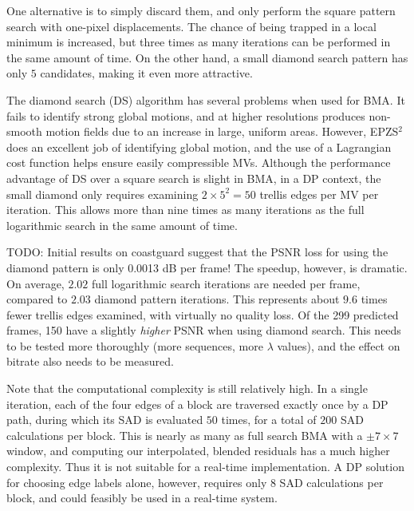 \documentclass[11pt,letterpaper]{article}
\begin{document}
One alternative is to simply discard them, and only perform the square pattern
 search with one-pixel displacements.
The chance of being trapped in a local minimum is increased, but three times as
 many iterations can be performed in the same amount of time.
On the other hand, a small diamond search pattern has only $5$ candidates,
 making it even more attractive.

The diamond search (DS) algorithm has several problems when used for BMA.
It fails to identify strong global motions, and at higher resolutions produces
 non-smooth motion fields due to an increase in large, uniform areas.
However, EPZS${}^2$ does an excellent job of identifying global motion, and the
 use of a Lagrangian cost function helps ensure easily compressible MVs.
Although the performance advantage of DS over a square search is slight in
 BMA, in a DP context, the small diamond only requires examining
 $2\times 5^2=50$ trellis edges per MV per iteration.
This allows more than nine times as many iterations as the full logarithmic
 search in the same amount of time.

TODO: Initial results on coastguard suggest that the PSNR loss for using the
 diamond pattern is only 0.0013 dB per frame!
The speedup, however, is dramatic.
On average, $2.02$ full logarithmic search iterations are needed per frame,
 compared to $2.03$ diamond pattern iterations.
This represents about $9.6$ times fewer trellis edges examined, with virtually
 no quality loss.
Of the 299 predicted frames, 150 have a slightly \textit{higher} PSNR when
 using diamond search.
This needs to be tested more thoroughly (more sequences, more $\lambda$
 values), and the effect on bitrate also needs to be measured.

Note that the computational complexity is still relatively high.
In a single iteration, each of the four edges of a block are traversed exactly
 once by a DP path, during which its SAD is evaluated $50$ times, for a total
 of $200$ SAD calculations per block.
This is nearly as many as full search BMA with a $\pm 7\times 7$ window, and
 computing our interpolated, blended residuals has a much higher complexity.
Thus it is not suitable for a real-time implementation.
A DP solution for choosing edge labels alone, however, requires only $8$ SAD
 calculations per block, and could feasibly be used in a real-time system.
\end{document}
